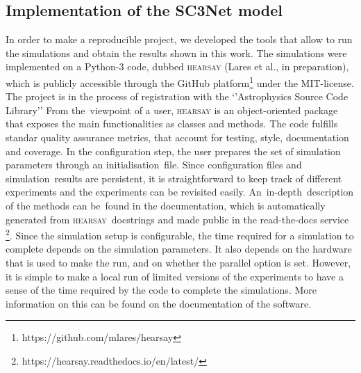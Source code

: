 \documentclass[crop]{CSLB}
\newcommand{\hs}{\textsc{hearsay}}
\begin{document}
\subsection{Implementation of the SC3Net model}

In order to make a reproducible project, we developed the tools that
allow to run the simulations and obtain the results shown in this
work.
%
The simulations were implemented on a Python-3 code, dubbed \hs{}
(Lares et al., in preparation), which is publicly accessible through
the GitHub platform\footnote{https://github.com/mlares/hearsay} under
the MIT-license.
%
The project is in the process of registration with the ‘’Astrophysics
Source Code Library’’ \citep[ASCL, ][]{2015JORS....3E..15A,
2020ASPC..522..731A}
%
From the viewpoint of a user, \hs{} is an object-oriented package that
exposes the main functionalities as classes and methods.
%
The code fulfills standar quality assurance metrics, that account for
testing, style, documentation and coverage.
%
In the configuration step, the user prepares the set of simulation
parameters through an initialisation file.
%
Since configuration files and simulation results are persistent, it is
straightforward to keep track of different experiments and the
experiments can be revisited easily.
%
An in-depth description of the methods can be found in the
documentation, which is automatically generated from \hs{} docstrings
and made public in the read-the-docs service
\footnote{https://hearsay.readthedocs.io/en/latest/}.
%
Since the simulation setup is configurable, the time required for a
simulation to complete depends on the simulation parameters.
%
It also depends on the hardware that is used to make the run, and on
whether the parallel option is set.
%
However, it is simple to make a local run of limited versions of the
experiments to have a sense of the time required by the code to
complete the simulations.
%
More information on this can be found on the documentation of the
software.
\end{document}
